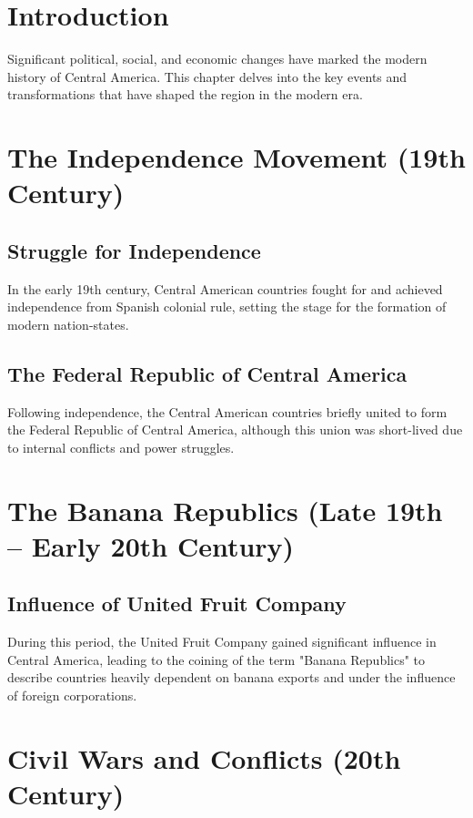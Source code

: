 \documentclass{book}
\begin{document}
\section{Introduction}
\label{sec:introduction-modern-central-america}
Significant political, social, and economic changes have marked the modern history of Central America. This chapter delves into the key events and transformations that have shaped the region in the modern era.

\section{The Independence Movement (19th Century)}
\label{sec:independence-movement}
\subsection{Struggle for Independence}
\label{subsec:struggle-independence}
In the early 19th century, Central American countries fought for and achieved independence from Spanish colonial rule, setting the stage for the formation of modern nation-states.

\subsection{The Federal Republic of Central America}
\label{subsec:federal-republic}
Following independence, the Central American countries briefly united to form the Federal Republic of Central America, although this union was short-lived due to internal conflicts and power struggles.

\section{The Banana Republics (Late 19th – Early 20th Century)}
\label{sec:banana-republics}
\subsection{Influence of United Fruit Company}
\label{subsec:influence-united-fruit}
During this period, the United Fruit Company gained significant influence in Central America, leading to the coining of the term "Banana Republics" to describe countries heavily dependent on banana exports and under the influence of foreign corporations.

\section{Civil Wars and Conflicts (20th Century)}
\label{sec:civil-wars-conflicts}
\end{document}
